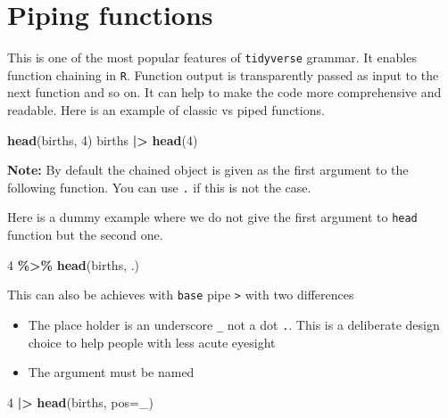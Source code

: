 \documentclass[
]{book}
\newenvironment{Shaded}{\begin{snugshade}}{\end{snugshade}}
\newcommand{\AttributeTok}[1]{\textcolor[rgb]{0.13,0.29,0.53}{#1}}
\newcommand{\DecValTok}[1]{\textcolor[rgb]{0.00,0.00,0.81}{#1}}
\newcommand{\FunctionTok}[1]{\textcolor[rgb]{0.13,0.29,0.53}{\textbf{#1}}}
\newcommand{\NormalTok}[1]{#1}
\newcommand{\SpecialCharTok}[1]{\textcolor[rgb]{0.81,0.36,0.00}{\textbf{#1}}}
\providecommand{\tightlist}{%
  \setlength{\itemsep}{0pt}\setlength{\parskip}{0pt}}
\begin{document}
\section{Piping functions}\label{piping-functions}

This is one of the most popular features of \texttt{tidyverse} grammar. It enables function chaining in
\texttt{R}. Function output is transparently passed as input to the next function and so on.
It can help to make the code more comprehensive and readable.
Here is an example of classic vs piped functions.

\begin{Shaded}
\begin{Highlighting}[]
\FunctionTok{head}\NormalTok{(births, }\DecValTok{4}\NormalTok{)}
\NormalTok{births }\SpecialCharTok{|\textgreater{}} \FunctionTok{head}\NormalTok{(}\DecValTok{4}\NormalTok{)}
\end{Highlighting}
\end{Shaded}

\textbf{Note:} By default the chained object is given as the first argument to the following
function.
You can use \texttt{.} if this is not the case.

Here is a dummy example where we do not give the first argument to \texttt{head} function but the second one.

\begin{Shaded}
\begin{Highlighting}[]
\DecValTok{4} \SpecialCharTok{\%\textgreater{}\%} \FunctionTok{head}\NormalTok{(births, .)}
\end{Highlighting}
\end{Shaded}

This can also be achieves with \texttt{base} pipe \texttt{\textbar{}\textgreater{}} with two differences

\begin{itemize}
\tightlist
\item
  The place holder is an underscore \texttt{\_} not a dot \texttt{.}. This is a deliberate design choice to help people with less acute eyesight
\item
  The argument must be named
\end{itemize}

\begin{Shaded}
\begin{Highlighting}[]
\DecValTok{4} \SpecialCharTok{|\textgreater{}} \FunctionTok{head}\NormalTok{(births, }\AttributeTok{pos=}\NormalTok{\_)}
\end{Highlighting}
\end{Shaded}
\end{document}
